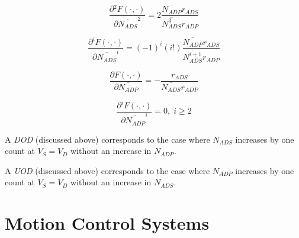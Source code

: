 \begin{equation}
\label{eq:csoc1:srcs0:soeq0:spsa0:11b}
\frac{\partial{}^2 F(\cdot{},\cdot{})}{\partial \overline{N_{ADS}}^2}
= 
2
\frac{\overline{N_{ADP}} r_{ADS}}{\overline{N_{ADS}^3} r_{ADP}}
\end{equation}

\begin{equation}
\label{eq:csoc1:srcs0:soeq0:spsa0:11c}
\frac{\partial{}^i F(\cdot{},\cdot{})}{\partial \overline{N_{ADS}}^i}
= 
(-1)^i (i!)
\frac{\overline{N_{ADP}} r_{ADS}}{\overline{N_{ADS}^{i+1}} r_{ADP}}
\end{equation}


\begin{equation}
\label{eq:csoc1:srcs0:soeq0:spsa0:12}
\frac{\partial{}F(\cdot{},\cdot{})}{\partial \overline{N_{ADP}}}
= 
-
\frac{r_{ADS}}{\overline{N_{ADS}} r_{ADP}}
\end{equation}

\begin{equation}
\label{eq:csoc1:srcs0:soeq0:spsa0:12b}
\frac{\partial{}^i F(\cdot{},\cdot{})}{\partial \overline{N_{ADP}}^i}
= 
0, \; i \geq 2
\end{equation}

A \emph{DOD} (discussed above) corresponds to the case where
$N_{ADS}$ increases by one count at $V_S=V_D$ without an increase in
$N_{ADP}$.    


A \emph{UOD} (discussed above) corresponds to the case where
$N_{ADP}$ increases by one count at $V_S=V_D$ without an increase in
$N_{ADS}$.    




\section{Motion Control Systems}



